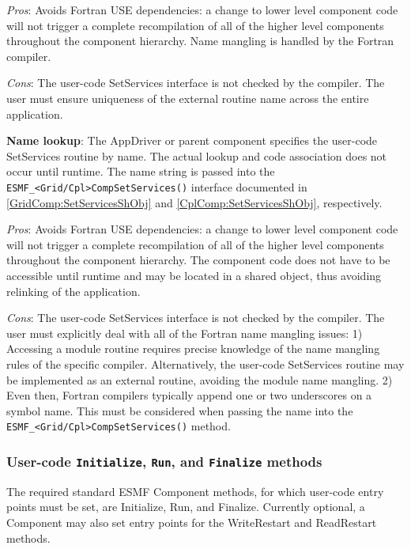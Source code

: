 \begin{itemize}
{\em Pros}: Avoids Fortran USE dependencies: a change to lower level component code will not trigger a complete recompilation of all of the higher level components throughout the component hierarchy. Name mangling is handled by the Fortran compiler.

{\em Cons}: The user-code SetServices interface is not checked by the compiler. The user must ensure uniqueness of the external routine name across the entire application.

\begin{sloppypar}
\item {\bf Name lookup}: The AppDriver or parent component specifies the user-code SetServices routine by name. The actual lookup and code association does not occur until runtime. The name string is passed into the {\tt ESMF\_<Grid/Cpl>CompSetServices()} interface documented in \ref{GridComp:SetServicesShObj} and \ref{CplComp:SetServicesShObj}, respectively.

{\em Pros}: Avoids Fortran USE dependencies: a change to lower level component code will not trigger a complete recompilation of all of the higher level components throughout the component hierarchy. The component code does not have to be accessible until runtime and may be located in a shared object, thus avoiding relinking of the application.

{\em Cons}: The user-code SetServices interface is not checked by the compiler. The user must explicitly deal with all of the Fortran name mangling issues: 1) Accessing a module routine requires precise knowledge of the name mangling rules of the specific compiler. Alternatively, the user-code SetServices routine may be implemented as an external routine, avoiding the module name mangling. 2) Even then, Fortran compilers typically append one or two underscores on a symbol name. This must be considered when passing the name into the {\tt ESMF\_<Grid/Cpl>CompSetServices()} method.

\end{sloppypar}
\end{itemize}

\subsubsection{User-code {\tt Initialize}, {\tt Run}, and {\tt Finalize} methods}

The required standard ESMF Component methods, for which user-code entry
points must be set, are Initialize, Run, and Finalize. Currently optional,
a Component may also set entry points for the WriteRestart and
ReadRestart methods.

